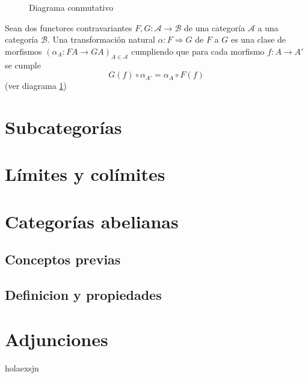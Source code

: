 \begin{figure}[htpb]
    \centering
    \caption{Diagrama conmutativo}
    \label{diag:trans_natural_contra}
\end{figure}

\begin{definicion}
    Sean dos functores contravariantes $F,G: \mathscr{A} \longrightarrow \mathscr{B}$ de una categoría $\mathscr{A}$ a una categoría $\mathscr{B}$. Una transformación natural $\alpha: F \Rightarrow G$ de $F$ a $G$ es una clase de morfismos $(\alpha_A:FA \longrightarrow GA)_{A\in \mathscr{A}}$ cumpliendo que para cada morfismo $f: A \longrightarrow A'$ se cumple \begin{equation}
        G(f) \circ \alpha_{A'} = \alpha_{A} \circ F(f)
    \end{equation}
    (ver diagrama \ref{diag:trans_natural_contra})
    \label{t_natural_contra}    
\end{definicion}

\section{Subcategorías}

\section{Límites y colímites}

\section{Categorías abelianas}

\subsection{Conceptos previas}

\subsection{Definicion y propiedades}

\section{Adjunciones}
holaexsjn

